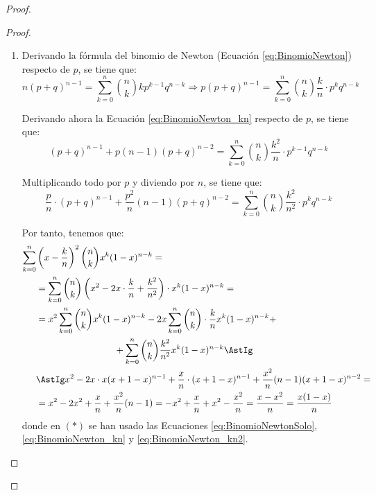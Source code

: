 \begin{proof}
\begin{lema}
\begin{proof}
\begin{enumerate}
                \item Derivando la fórmula del binomio de Newton (Ecuación \ref{eq:BinomioNewton}) respecto de $p$, se tiene que:
                \begin{equation}\label{eq:BinomioNewton_kn}
                    n(p+q)^{n-1} = \sum_{k=0}^n \binom{n}{k} k p^{k-1} q^{n-k}
                    \Longrightarrow
                    p(p+q)^{n-1} = \sum_{k=0}^n \binom{n}{k} \frac{k}{n}\cdot p^k q^{n-k}
                \end{equation}

                Derivando ahora la Ecuación \ref{eq:BinomioNewton_kn} respecto de $p$, se tiene que:
                \begin{equation*}
                    (p+q)^{n-1} + p(n-1)(p+q)^{n-2} = \sum_{k=0}^n \binom{n}{k} \frac{k^2}{n}\cdot p^{k-1} q^{n-k}
                \end{equation*}

                Multiplicando todo por $p$ y diviendo por $n$, se tiene que:
                \begin{equation}\label{eq:BinomioNewton_kn2}
                    \frac{p}{n}\cdot(p+q)^{n-1} + \frac{p^2}{n}(n-1)(p+q)^{n-2} = \sum_{k=0}^n \binom{n}{k} \frac{k^2}{n^2}\cdot p^{k} q^{n-k}
                \end{equation}

                Por tanto, tenemos que:
                \begin{align*}
                    \sum_{k=0}^n & \left(x-\frac{k}{n}\right)^2 \binom{n}{k} x^k(1-x)^{n-k}
                    =\\&= \sum_{k=0}^n \binom{n}{k} \left(x^2 - 2x\cdot \frac{k}{n} + \frac{k^2}{n^2}\right)\cdot x^k(1-x)^{n-k}
                    =\\&= x^2 \sum_{k=0}^n \binom{n}{k} x^{k}(1-x)^{n-k} - 2x\sum_{k=0}^n \binom{n}{k}\cdot \frac{k}{n} x^k(1-x)^{n-k} +\\&\hspace{3cm}+ \sum_{k=0}^n \binom{n}{k} \frac{k^2}{n^2} x^k(1-x)^{n-k}
                    \AstIg\\&\AstIg x^2 - 2x\cdot x(x+1-x)^{n-1} + \frac{x}{n}\cdot (x+1-x)^{n-1} + \frac{x^2}{n}(n-1)(x+1-x)^{n-2}
                    =\\&= x^2 - 2x^2 + \frac{x}{n} + \frac{x^2}{n}(n-1)
                    = -x^2 + \frac{x}{n} + x^2 - \frac{x^2}{n} = \frac{x-x^2}{n} = \frac{x(1-x)}{n}
                \end{align*}
                donde en $(\ast)$ se han usado las Ecuaciones \ref{eq:BinomioNewtonSolo}, \ref{eq:BinomioNewton_kn} y \ref{eq:BinomioNewton_kn2}.



\end{enumerate}
\end{proof}
\end{lema}
\end{proof}
